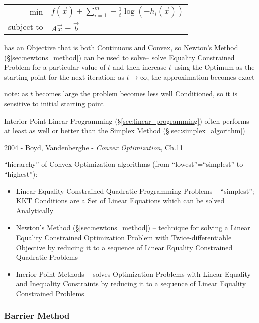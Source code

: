 \begin{tabular}{r l}
  $\mathrm{min}$ &
    $f(\vec{x}) + \sum_{i=1}^m -\frac{1}{t} \log(-h_i(\vec{x}))$ \\
  subject to     & $A\vec{x} = \vec{b}$ \\
\end{tabular}

has an Objective that is both Continuous and Convex, so Newton's Method
(\S\ref{sec:newtons_method}) can be used to solve-- solve Equality Constrained
Problem for a particular value of $t$ and then increase $t$ using the Optimum
as the starting point for the next iteration; as $t \rightarrow \infty$, the
approximation becomes exact

note: as $t$ becomes large the problem becomes less well Conditioned, so it is
sensitive to initial starting point

\fist Interior Point Linear Programming (\S\ref{sec:linear_programming}) often
performs at least as well or better than the Simplex Method
(\S\ref{sec:simplex_algorithm})


\asterism

2004 - Boyd, Vandenberghe - \emph{Convex Optimization}, Ch.11

``hierarchy'' of Convex Optimization algorithms (from ``lowest''=``simplest'' to
``highest''):
\begin{itemize}
  \item Linear Equality Constrained Quadratic Programming Problems --
    ``simplest''; KKT Conditions are a Set of Linear Equations which can be
    solved Analytically
  \item Newton's Method (\S\ref{sec:newtons_method}) -- technique for solving a
    Linear Equality Constrained Optimization Problem with Twice-differentiable
    Objective by reducing it to a sequence of Linear Equality Constrained
    Quadratic Problems
  \item Inerior Point Methods -- solves Optimization Problems with Linear
    Equality and Inequality Constraints by reducing it to a sequence of Linear
    Equality Constrained Problems
\end{itemize}



\subsubsection{Barrier Method}\label{sec:barrier_method}



